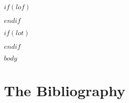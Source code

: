 \documentclass[ms]{uncgdissertationexp}
\theoremstyle{plain}
\theoremstyle{definition}
\theoremstyle{remark}
\begin{document}
\tableofcontents

\listoftables
$if(lof)$
\listoffigures
$endif$


\listoffigures
$if(lot)$
\listoftables
$endif$


\mainmatter %
$body$

\section{The Bibliography}






\end{document}
